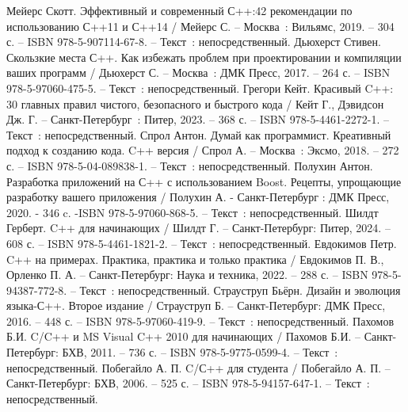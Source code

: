 \begin{thebibliography}{20}
     Мейерс Скотт. Эффективный и современный С++:42 рекомендации по использованию С++11 и С++14 / Мейерс С. – Москва~: Вильямс, 2019. – 304 с. – ISBN 978-5-907114-67-8. – Текст~: непосредственный.
	 Дьюхерст Стивен. Скользкие места С++. Как избежать проблем при проектировании и компиляции ваших программ / Дьюхерст С. – Москва~: ДМК Пресс, 2017. – 264 с. – ISBN 978-5-97060-475-5. – Текст~: непосредственный.
	 Грегори Кейт. Красивый C++: 30 главных правил чистого, безопасного и быстрого кода / Кейт Г., Дэвидсон Дж. Г. – Санкт-Петербург~: Питер, 2023. – 368 с. – ISBN 978-5-4461-2272-1. – Текст~: непосредственный.
	 Спрол Антон. Думай как программист. Креативный подход к созданию кода. C++ версия / Спрол А. – Москва~: Эксмо, 2018. – 272 с. – ISBN 978-5-04-089838-1. – Текст~: непосредственный.
	 Полухин Антон. Разработка приложений на С++ с использованием Boost. Рецепты, упрощающие разработку вашего приложения / Полухин А. - Санкт-Петербург : ДМК Пресс, 2020. - 346 c. -ISBN 978-5-97060-868-5. – Текст~: непосредственный.
	 Шилдт Герберт. C++ для начинающих / Шилдт Г. – Санкт-Петербург: Питер, 2024. – 608 с. – ISBN 978-5-4461-1821-2. – Текст~: непосредственный.
	 Евдокимов Петр. C++ на примерах. Практика, практика и только практика / Евдокимов П. В., Орленко П. А. – Санкт-Петербург: Наука и техника, 2022. – 288 с. – ISBN 978-5-94387-772-8. – Текст~: непосредственный.
	 Страуструп Бьёрн. Дизайн и эволюция языка-С++. Второе издание / Страуструп Б. – Санкт-Петербург: ДМК Пресс, 2016. – 448 с. – ISBN 978-5-97060-419-9. – Текст~: непосредственный.
	 Пахомов Б.И. C/C++ и MS Visual C++ 2010 для начинающих / Пахомов Б.И. – Санкт-Петербург: БХВ, 2011. – 736 с. – ISBN 978-5-9775-0599-4. – Текст~: непосредственный.
	 Побегайло А. П.  C/С++ для студента / Побегайло А. П. – Санкт-Петербург: БХВ, 2006. – 525 с. – ISBN 978-5-94157-647-1. – Текст~: непосредственный.
\end{thebibliography}
